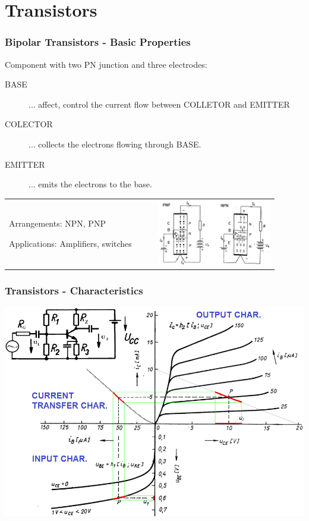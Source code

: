 \documentclass{beamer}
\begin{document}
\section{\texorpdfstring{Transistors}{Transistors}}
	\begin{frame}
    \frametitle{Bipolar Transistors - Basic Properties}
		\small
		Component with two PN junction and three electrodes:
		
		\begin{description}
			\item[BASE]... affect, control the current flow between COLLETOR and EMITTER
			\item[COLECTOR]... collects the electrons flowing through BASE.
			\item[EMITTER]... emits the electrons to the base.
		\end{description}
		\begin{tabular}{m{0.5\linewidth} m{0.4\linewidth}}
		\begin{flushleft}
			Arrangements: NPN, PNP
		\end{flushleft}
		\begin{flushleft}
			Applications: Amplifiers, switches
		\end{flushleft}
		 &
		\includegraphics[scale=0.4]{obr13_pnpnpn.png} 
		\end{tabular}
	\end{frame}
	\begin{frame}
    \frametitle{Transistors - Characteristics}
		\begin{center}
			\includegraphics[scale=0.35]{obr08_charTranzistoru.png} 
		\end{center}
	\end{frame}
\end{document}
